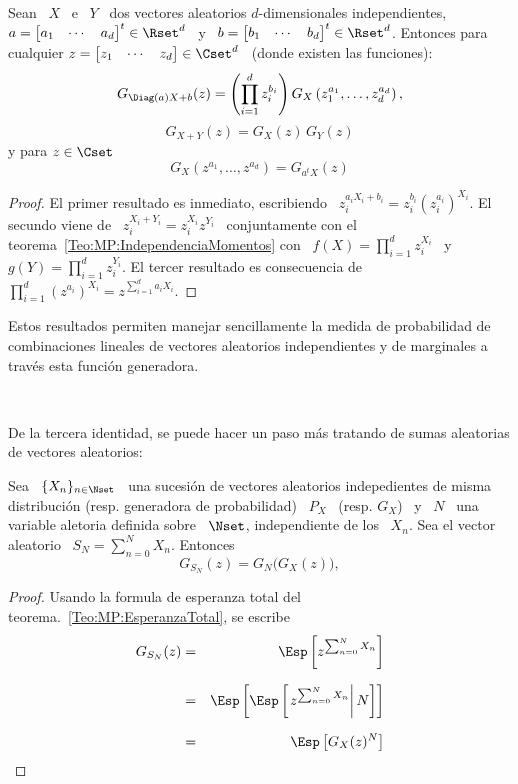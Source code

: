 \begin{teorema}%
\label{Teo:MP:PropiedadesGeneradoraProbabilidad}
%
  Sean  \   $X$  \  e  \   $Y$  \  dos   vectores  aleatorios  $d$-dimensionales
  independientes, $a  = \begin{bmatrix} a_1  & \cdots & a_d  \end{bmatrix}^t \in
  \Rset^d$ \  y \ $b  = \begin{bmatrix} b_1  & \cdots & b_d  \end{bmatrix}^t \in
  \Rset^d$.  Entonces  para  cualquier  $z  = \begin{bmatrix}  z_1  &  \cdots  &
    z_d \end{bmatrix}\in \Cset^d$ \ (donde existen las funciones):
  \[
  G_{\Diag(a)  X +  b}(z)  = \left(  \prod_{i=1}^d  z_i^{b_i} \right)  G_X\left(
    z_1^{a_1} , \ldots , z_d^{a_d} \right),
  \]
  \[
  G_{X+Y}(z) = G_X(z) \, G_Y(z)
  \]
  y para $z \in \Cset$
  \[
  G_X\left( z^{a_1} , \ldots , z^{a_d} \right) = G_{a^t X}(z)
  \]
\end{teorema}
%
\begin{proof}
  El  primer  resultado es  inmediato,  escribiendo \  $z_i^{a_i  X_i  + b_i}  =
  z_i^{b_i}   \left(  z_i^{a_i}   \right)^{X_i}$.    El  secundo   viene  de   \
  $z_i^{X_i+Y_i}    =    z_i^{X_i}    z^{Y_i}$    \   conjuntamente    con    el
  teorema~\ref{Teo:MP:IndependenciaMomentos}   con   \   $f(X)  =   \prod_{i=1}^d
  z_i^{X_i}$  \ y \  $g(Y) =  \prod_{i=1}^d z_i^{Y_i}$.  El tercer  resultado es
  consecuencia de $\prod_{i=1}^d  \left( z^{a_i} \right)^{X_i} = z^{\sum_{i=1}^d
    a_i X_i}$.
\end{proof}
%
Estos  resultados permiten manejar  sencillamente la  medida de  probabilidad de
combinaciones lineales  de vectores aleatorios independientes y  de marginales a
trav\'es esta funci\'on generadora.

\

De  la  tercera identidad,  se  puede  hacer un  paso  m\'as  tratando de  sumas
aleatorias de vectores aleatorios:
%
\begin{teorema}\label{Teo:MP:SumaAleatoriaGeneradoraProbabilidad}
%
  Sea  \ $\{  X_n \}_{n  \in \Nset}$  \, una  sucesi\'on de  vectores aleatorios
  indepedientes de  misma distribuci\'on  (resp.  generadora de  probabilidad) \
  $P_X$ \  (resp.  $G_X$) \  y \  $N$ \ una  variable aletoria definida  sobre \
  $\Nset$, independiente  de los  \ $X_n$.  Sea  el vector  aleatorio \ $  S_N =
  \sum_{n=0}^N X_n$. Entonces
  \[
  G_{S_N}(z) =  G_N \big( G_X(z) \big),
  \]
\end{teorema}
%
\begin{proof}
  Usando la formula de esperanza total del teorema.~\ref{Teo:MP:EsperanzaTotal}, se escribe
  \begin{eqnarray*}
  G_{S_N}(z) & = & \Esp\left[ z^{\sum_{n=0}^N X_n} \right]\\[2.5mm]
  & = & \Esp\left[ \Esp\left[ \left. z^{\sum_{n=0}^N X_n} \right| N  \right] \right]\\[2.5mm]
  & = & \Esp\left[ G_X(z)^N \right]
  \end{eqnarray*}
\end{proof}



